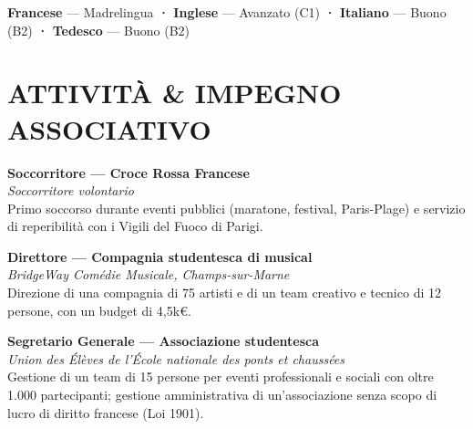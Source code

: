 \documentclass[a4paper,9pt]{extarticle}
\newcommand{\wideentry}[3]{%
  \noindent\textbf{#1}\\
  \textit{\small\textcolor{muted}{#2}}\\
  \small #3\par
  \vspace{1pt}
}
\begin{document}
\noindent\small
\textbf{Francese} — Madrelingua \quad\textbf{·}\quad
\textbf{Inglese} — Avanzato (C1) \quad\textbf{·}\quad
\textbf{Italiano} — Buono (B2) \quad\textbf{·}\quad
\textbf{Tedesco} — Buono (B2)

\section{ATTIVITÀ \& IMPEGNO ASSOCIATIVO}

\wideentry
  {Soccorritore — Croce Rossa Francese}
  {Soccorritore volontario}
  {Primo soccorso durante eventi pubblici (maratone, festival, Paris-Plage) e servizio di reperibilità con i Vigili del Fuoco di Parigi.}

\wideentry
  {Direttore — Compagnia studentesca di musical}
  {BridgeWay Comédie Musicale, Champs-sur-Marne}
  {Direzione di una compagnia di 75 artisti e di un team creativo e tecnico di 12 persone, con un budget di 4,5k€.}

\wideentry
  {Segretario Generale — Associazione studentesca}
  {Union des Élèves de l'École nationale des ponts et chaussées}
  {Gestione di un team di 15 persone per eventi professionali e sociali con oltre 1.000 partecipanti; gestione amministrativa di un'associazione senza scopo di lucro di diritto francese (Loi 1901).}

\vfill
\noindent{\scriptsize\textcolor{muted}{Autorizzo il trattamento dei miei dati personali ai sensi del D.Lgs. 196/2003 e del Regolamento UE 2016/679 (GDPR).}}
\end{document}
